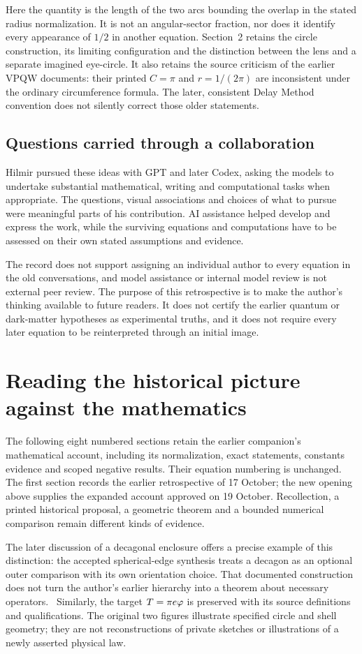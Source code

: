 Here the quantity is the length of the two arcs bounding the overlap in the stated radius normalization. It is not an angular-sector fraction, nor does it identify every appearance of $1/2$ in another equation. Section~2 retains the circle construction, its limiting configuration and the distinction between the lens and a separate imagined eye-circle. It also retains the source criticism of the earlier VPQW documents: their printed $C=\pi$ and $r=1/(2\pi)$ are inconsistent under the ordinary circumference formula. The later, consistent Delay Method convention does not silently correct those older statements.

\subsection*{Questions carried through a collaboration}
Hilmir pursued these ideas with GPT and later Codex, asking the models to undertake substantial mathematical, writing and computational tasks when appropriate. The questions, visual associations and choices of what to pursue were meaningful parts of his contribution. AI assistance helped develop and express the work, while the surviving equations and computations have to be assessed on their own stated assumptions and evidence.

The record does not support assigning an individual author to every equation in the old conversations, and model assistance or internal model review is not external peer review. The purpose of this retrospective is to make the author's thinking available to future readers. It does not certify the earlier quantum or dark-matter hypotheses as experimental truths, and it does not require every later equation to be reinterpreted through an initial image.

\section*{Reading the historical picture against the mathematics}
The following eight numbered sections retain the earlier companion's mathematical account, including its normalization, exact statements, constants evidence and scoped negative results. Their equation numbering is unchanged. The first section records the earlier retrospective of 17 October; the new opening above supplies the expanded account approved on 19 October. Recollection, a printed historical proposal, a geometric theorem and a bounded numerical comparison remain different kinds of evidence.

The later discussion of a decagonal enclosure offers a precise example of this distinction: the accepted spherical-edge synthesis treats a decagon as an optional outer comparison with its own orientation choice. That documented construction does not turn the author's earlier hierarchy into a theorem about necessary operators.~\cite[Sec.~14; App.~D]{SP} Similarly, the target $T=\pi e\varphi$ is preserved with its source definitions and qualifications. The original two figures illustrate specified circle and shell geometry; they are not reconstructions of private sketches or illustrations of a newly asserted physical law.


